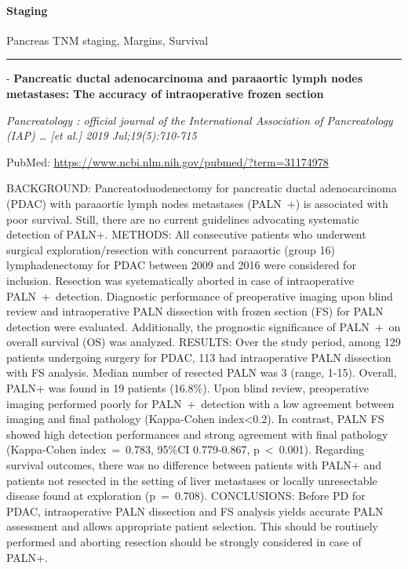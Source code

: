 \documentclass[]{article}
\let\oldparagraph\paragraph
\renewcommand{\paragraph}[1]{\oldparagraph{#1}\mbox{}}
\begin{document}
\pagebreak

\hypertarget{staging}{%
\paragraph{Staging}\label{staging}}

Pancreas TNM staging, Margins, Survival

\begin{center}\rule{0.5\linewidth}{\linethickness}\end{center}

 - \textbf{Pancreatic ductal adenocarcinoma and paraaortic lymph nodes
metastases: The accuracy of intraoperative frozen section}

\emph{Pancreatology : official journal of the International Association
of Pancreatology (IAP) \ldots{} {[}et al.{]} 2019 Jul;19(5):710-715}

PubMed: \url{https://www.ncbi.nlm.nih.gov/pubmed/?term=31174978}

BACKGROUND: Pancreatoduodenectomy for pancreatic ductal adenocarcinoma
(PDAC) with paraaortic lymph nodes metastases (PALN~+) is associated
with poor survival. Still, there are no current guidelines advocating
systematic detection of PALN+. METHODS: All consecutive patients who
underwent surgical exploration/resection with concurrent paraaortic
(group 16) lymphadenectomy for PDAC between 2009 and 2016 were
considered for inclusion. Resection was systematically aborted in case
of intraoperative PALN~+~detection. Diagnostic performance of
preoperative imaging upon blind review and intraoperative PALN
dissection with frozen section (FS) for PALN detection were evaluated.
Additionally, the prognostic significance of PALN~+~on overall survival
(OS) was analyzed. RESULTS: Over the study period, among 129 patients
undergoing surgery for PDAC, 113 had intraoperative PALN dissection with
FS analysis. Median number of resected PALN was 3 (range, 1-15).
Overall, PALN+ was found in 19 patients (16.8\%). Upon blind review,
preoperative imaging performed poorly for PALN~+~detection with a low
agreement between imaging and final pathology (Kappa-Cohen
index\textless{}0.2). In contrast, PALN FS showed high detection
performances and strong agreement with final pathology (Kappa-Cohen
index~=~0.783, 95\%CI 0.779-0.867, p~\textless{}~0.001). Regarding
survival outcomes, there was no difference between patients with PALN+
and patients not resected in the setting of liver metastases or locally
unresectable disease found at exploration (p~=~0.708). CONCLUSIONS:
Before PD for PDAC, intraoperative PALN dissection and FS analysis
yields accurate PALN assessment and allows appropriate patient
selection. This should be routinely performed and aborting resection
should be strongly considered in case of PALN+.
\end{document}

